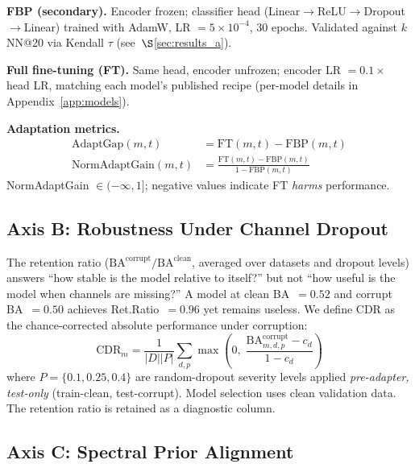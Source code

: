 \documentclass{article}
\newcommand{\cdr}{\textsc{CDR}\xspace}
\begin{document}
\textbf{FBP (secondary).} Encoder frozen; classifier head (Linear$\to$ReLU$\to$Dropout$\to$Linear) trained with AdamW, LR $= 5{\times}10^{-4}$, 30 epochs. Validated against $k$NN@20 via Kendall $\tau$ (see~$\S$\ref{sec:results_a}).

\textbf{Full fine-tuning (FT).} Same head, encoder unfrozen; encoder LR $= 0.1 \times$ head LR, matching each model's published recipe (per-model details in Appendix~\ref{app:models}).

\textbf{Adaptation metrics.}
\vspace{-0.5em}
\begin{align}
\text{AdaptGap}(m, t) &= \text{FT}(m, t) - \text{FBP}(m, t) \label{eq:adaptgap} \\
\text{NormAdaptGain}(m, t) &= \frac{\text{FT}(m, t) - \text{FBP}(m, t)}{1 - \text{FBP}(m, t)} \label{eq:nag}
\end{align}
\vspace{-0.5em}
NormAdaptGain $\in (-\infty, 1]$; negative values indicate FT \emph{harms} performance.

\subsection{Axis B: Robustness Under Channel Dropout}
\label{sec:axis_b}

The retention ratio ($\text{BA}^{\text{corrupt}} / \text{BA}^{\text{clean}}$, averaged over datasets and dropout levels) answers ``how stable is the model relative to itself?'' but not ``how useful is the model when channels are missing?'' A model at clean BA~$= 0.52$ and corrupt BA~$= 0.50$ achieves Ret.Ratio~$= 0.96$ yet remains useless. We define \cdr as the chance-corrected absolute performance under corruption:
\begin{equation}
\boxed{\text{CDR}_m = \frac{1}{|D||P|} \sum_{d,p} \max\!\left(0,\; \frac{\text{BA}^{\text{corrupt}}_{m,d,p} - c_d}{1 - c_d}\right)}
\label{eq:cdr}
\end{equation}
where $P = \{0.1, 0.25, 0.4\}$ are random-dropout severity levels applied \emph{pre-adapter, test-only} (train-clean, test-corrupt). Model selection uses clean validation data. The retention ratio is retained as a diagnostic column.

\subsection{Axis C: Spectral Prior Alignment}
\label{sec:axis_c}
\end{document}
